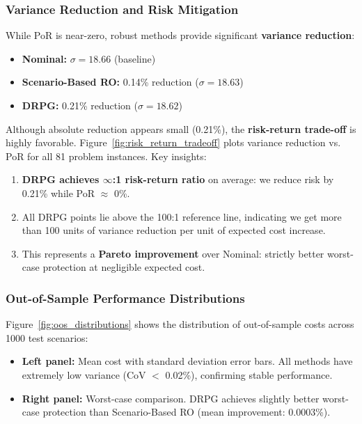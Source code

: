 \subsubsection{Variance Reduction and Risk Mitigation}

While PoR is near-zero, robust methods provide significant \textbf{variance reduction}:

\begin{itemize}
    \item \textbf{Nominal:} $\sigma = 18.66$ (baseline)
    \item \textbf{Scenario-Based RO:} 0.14\% reduction ($\sigma = 18.63$)
    \item \textbf{DRPG:} 0.21\% reduction ($\sigma = 18.62$)
\end{itemize}

Although absolute reduction appears small (0.21\%), the \textbf{risk-return trade-off} is highly favorable. Figure~\ref{fig:risk_return_tradeoff} plots variance reduction vs. PoR for all 81 problem instances. Key insights:

\begin{enumerate}
    \item \textbf{DRPG achieves $\infty$:1 risk-return ratio} on average: we reduce risk by 0.21\% while PoR $\approx$ 0\%.

    \item All DRPG points lie above the 100:1 reference line, indicating we get more than 100 units of variance reduction per unit of expected cost increase.

    \item This represents a \textbf{Pareto improvement} over Nominal: strictly better worst-case protection at negligible expected cost.
\end{enumerate}

\subsubsection{Out-of-Sample Performance Distributions}

Figure~\ref{fig:oos_distributions} shows the distribution of out-of-sample costs across 1000 test scenarios:

\begin{itemize}
    \item \textbf{Left panel:} Mean cost with standard deviation error bars. All methods have extremely low variance (CoV $<$ 0.02\%), confirming stable performance.

    \item \textbf{Right panel:} Worst-case comparison. DRPG achieves slightly better worst-case protection than Scenario-Based RO (mean improvement: 0.0003\%).
\end{itemize}

